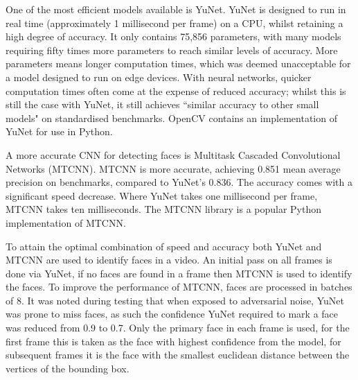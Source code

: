 One of the most efficient models available is YuNet\cite{wu2023yunet}. YuNet is designed to run in real time (approximately 1 millisecond per frame) on a CPU, whilst retaining a high degree of accuracy. It only contains 75,856 parameters, with many models requiring fifty times more parameters to reach similar levels of accuracy. More parameters means longer computation times, which was deemed unacceptable for a model designed to run on edge devices. With neural networks, quicker computation times often come at the expense of reduced accuracy; whilst this is still the case with YuNet, it still achieves ``similar accuracy to other small models" on standardised benchmarks. OpenCV contains an implementation of YuNet for use in Python\cite{yunetpyton}.

A more accurate CNN for detecting faces is Multitask Cascaded Convolutional Networks (MTCNN)\cite{zhang2016joint}. MTCNN is more accurate, achieving 0.851 mean average precision on benchmarks, compared to YuNet's 0.836. The accuracy comes with a significant speed decrease. Where YuNet takes one millisecond per frame, MTCNN takes ten milliseconds. The MTCNN library\cite{centeno2024mtcnn} is a popular Python implementation of MTCNN.

To attain the optimal combination of speed and accuracy both YuNet and MTCNN are used to identify faces in a video. An initial pass on all frames is done via YuNet, if no faces are found in a frame then MTCNN is used to identify the faces. To improve the performance of MTCNN, faces are processed in batches of 8. It was noted during testing that when exposed to adversarial noise, YuNet was prone to miss faces, as such the confidence YuNet required to mark a face was reduced from 0.9 to 0.7. Only the primary face in each frame is used, for the first frame this is taken as the face with highest confidence from the model, for subsequent frames it is the face with the smallest euclidean distance between the vertices of the bounding box. 

